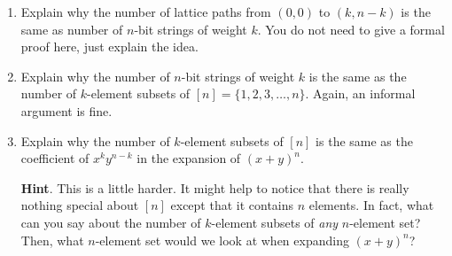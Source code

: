 \documentclass{book}
\begin{document}
\setcounter{cpjt}{68}
\addtocounter{cpjt}{-1}
\begin{activity}\label{activity-61}
\leavevmode%
\begin{enumerate}[font=\bfseries,label=(\alph*),ref=\alph*]
\item\label{task-88} \hypertarget{p-507}{}%
Explain why the number of lattice paths from \((0,0)\) to \((k,n-k)\) is the same as number of \(n\)-bit strings of weight \(k\). You do not need to give a formal proof here, just explain the idea.%
\item\label{task-89} \hypertarget{p-508}{}%
Explain why the number of \(n\)-bit strings of weight \(k\) is the same as the number of \(k\)-element subsets of \([n] = \{1,2,3,\ldots, n\}\).   Again, an informal argument is fine.%
\item\label{task-90} \hypertarget{p-509}{}%
Explain why the number of \(k\)-element subsets of \([n]\) is the same as the coefficient of \(x^ky^{n-k}\) in the expansion of \((x+y)^n\).%
\par\smallskip%
\noindent\textbf{Hint}.\hypertarget{hint-26}{}\quad%
\hypertarget{p-510}{}%
This is a little harder.  It might help to notice that there is really nothing special about \([n]\) except that it contains \(n\) elements.  In fact, what can you say about the number of \(k\)-element subsets of \emph{any} \(n\)-element set?  Then, what \(n\)-element set would we look at when expanding \((x+y)^n\)?%
\end{enumerate}
\end{activity}

\clearpage
\end{document}
